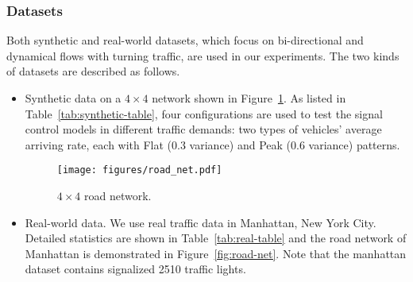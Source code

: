 \subsubsection{Datasets}
Both synthetic and real-world datasets, which focus on bi-directional and dynamical flows with turning traffic, are used in our experiments. The two kinds of datasets are described as follows.
\begin{itemize}[wide,noitemsep,topsep=0pt]
\item Synthetic data on a $4\times4$ network shown in Figure~\ref{fig:net}. As listed in Table~\ref{tab:synthetic-table}, four configurations are used to test the signal control models in different traffic demands: two types of vehicles' average arriving rate, each with Flat (0.3 variance) and Peak (0.6 variance) patterns. 



\begin{figure}[htbp]
\centering
\texttt{[image: figures/road\_net.pdf]}
\caption{$4\times4$ road network.}
\label{fig:net}
\end{figure}

\item Real-world data. We use real traffic data in Manhattan, New York City. Detailed statistics are shown in Table~\ref{tab:real-table} and the road network of Manhattan is demonstrated in Figure~\ref{fig:road-net}. Note that the manhattan dataset contains signalized 2510 traffic lights.\\


\end{itemize}
